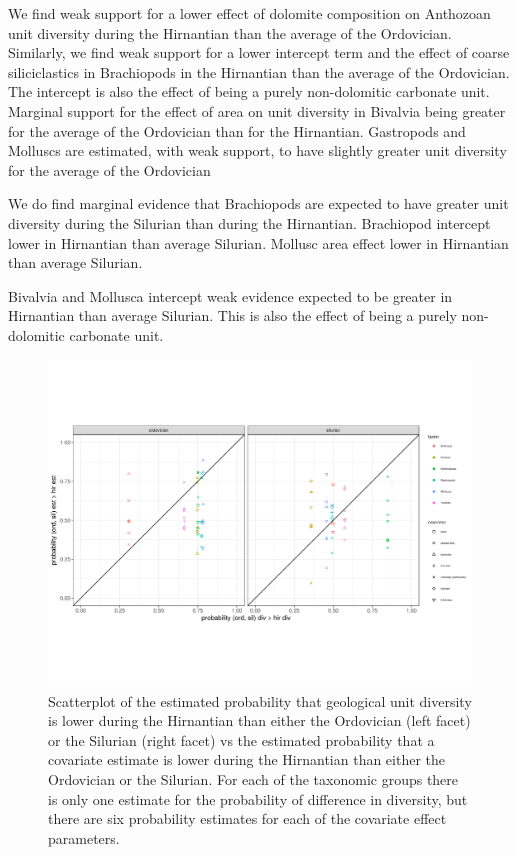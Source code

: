 \documentclass[12pt,letterpaper]{article}
\begin{document}
We find weak support for a lower effect of dolomite composition on Anthozoan unit diversity during the Hirnantian than the average of the Ordovician.
Similarly, we find weak support for a lower intercept term and the effect of coarse siliciclastics in Brachiopods in the Hirnantian than the average of the Ordovician. The intercept is also the effect of being a purely non-dolomitic carbonate unit.
Marginal support for the effect of area on unit diversity in Bivalvia being greater for the average of the Ordovician than for the Hirnantian.
Gastropods and Molluscs are estimated, with weak support, to have slightly greater unit diversity for the average of the Ordovician 

We do find marginal evidence that Brachiopods are expected to have greater unit diversity during the Silurian than during the Hirnantian. 
Brachiopod intercept lower in Hirnantian than average Silurian.
Mollusc area effect lower in Hirnantian than average Silurian.

Bivalvia and Mollusca intercept weak evidence expected to be greater in Hirnantian than average Silurian. This is also the effect of being a purely non-dolomitic carbonate unit.
\begin{figure}[ht]
  \centering
  \includegraphics[width=\textwidth,height=0.5\textheight,keepaspectratio=true]{figure/compare_pval_diversity}
  \caption{Scatterplot of the estimated probability that geological unit diversity is lower during the Hirnantian than either the Ordovician (left facet) or the Silurian (right facet) vs the estimated probability that a covariate estimate is lower during the Hirnantian than either the Ordovician or the Silurian. For each of the taxonomic groups there is only one estimate for the probability of difference in diversity, but there are six probability estimates for each of the covariate effect parameters. }
  \label{fig:pvalue}
\end{figure}
\end{document}
